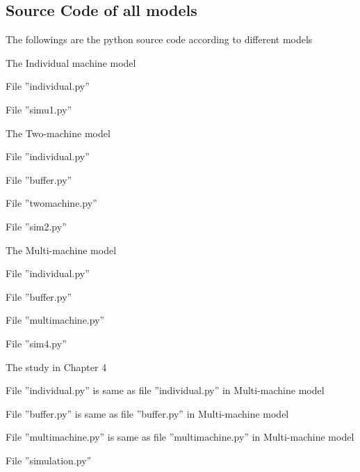 
\begin{appendix}

\chapter{Source Code of all models}

The followings are the python source code according to different models

The Individual machine model

File ''individual.py''

File ''simu1.py''

The Two-machine model

File ''individual.py''

File ''buffer.py''

File ''twomachine.py''

File ''sim2.py''

The Multi-machine model

File ''individual.py''

File ''buffer.py''

File ''multimachine.py''

File ''sim4.py''

The study in Chapter 4 

File ''individual.py'' is same as file ''individual.py'' in Multi-machine model

File ''buffer.py'' is same as file ''buffer.py'' in Multi-machine model

File ''multimachine.py'' is same as file ''multimachine.py'' in Multi-machine model

File ''simulation.py''
\end{appendix}